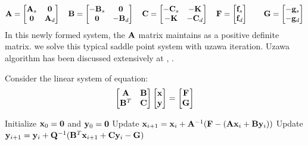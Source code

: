 \begin{equation}
\bold{A} = \begin{bmatrix}
\bold{A}_s   & \bold{0}    \\
\bold{0}     & \bold{A}_d  
\end{bmatrix}
\quad
\bold{B} = \begin{bmatrix}
-\bold{B}_s & \bold{0}   \\
\bold{0}   & -\bold{B}_d
\end{bmatrix}
\quad
\bold{C} = \begin{bmatrix}
- \bold{C}_s &  -\bold{K}   \\
- \bold{K}   &  -\bold{C}_d
\end{bmatrix}
\quad \bold{F} = \begin{bmatrix}
\bold{f}_s \\
\bold{f}_d
\end{bmatrix}
\quad
\quad \bold{G} = \begin{bmatrix}
-\bold{g}_s \\
-\bold{g}_d
\end{bmatrix}
\end{equation}
In this newly formed system, the $\bold{A}$ matrix maintains as a positive definite matrix.
we solve this typical saddle point system with uzawa iteration. Uzawa algorithm has been discussed
extensively at \cite{InexactUzawa_Elam_Golub}, \cite{AnalysisInexactUzawa_Bramble_Pasciak_Vassilev}.

Consider the linear system of equation:
\begin{equation}
\begin{bmatrix}
		  \bold{A}   & \bold{B} \\
		  \bold{B}^T & \bold{C}
\end{bmatrix} \begin{bmatrix}
\bold{x} \\ \bold{y}
\end{bmatrix} = \begin{bmatrix}
		  \bold{F} \\
		  \bold{G}
\end{bmatrix}
\end{equation}

\begin{algorithm}
\caption{Preconditioned Inexact Uzawa Iteration}
		  \begin{algorithmic}[1]
					 \State Initialize $\bold{x}_0 = \bold{0}$ and $\bold{y}_0 = \bold{0}$
					 \State Update $\bold{x}_{i+1} = \bold{x}_i + \bold{A}^{-1} (\bold{F} - (\bold{A}\bold{x}_i + \bold{B}\bold{y}_i))$
					 \State Update $\bold{y}_{i+1} = \bold{y}_i + \bold{Q}^{-1} ( \bold{B}^T\bold{x}_{i+1} + \bold{C}\bold{y}_{i} - \bold{G})$
\end{algorithmic}
\end{algorithm}

